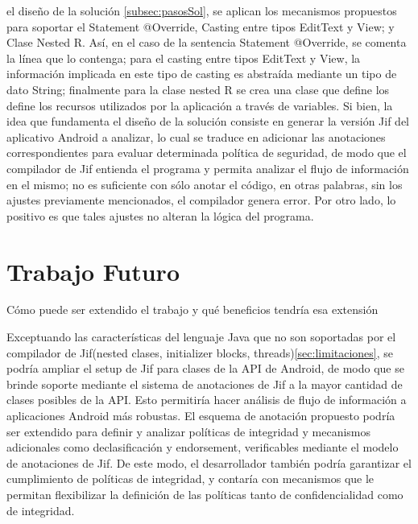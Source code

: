 el diseño de la solución \ref{subsec:pasosSol}, se aplican los mecanismos
propuestos para soportar el Statement @Override, Casting entre tipos EditText y
View; y Clase Nested R. Así, en el caso de  la sentencia Statement @Override, se
comenta la línea que lo contenga; para el casting entre tipos EditText y View,
la información implicada en este tipo de casting es abstraída mediante un tipo
de dato String; finalmente para la clase nested R se crea una clase que define
los define los recursos utilizados por la aplicación a través de variables.\newline 
Si bien, la idea que fundamenta el diseño de la solución consiste en generar la
versión Jif del aplicativo Android a analizar, lo cual se traduce en adicionar
las anotaciones correspondientes para evaluar determinada política de seguridad,
de modo que el compilador de Jif entienda el programa y permita analizar el
flujo de información en el mismo; no es suficiente con sólo anotar el código, en
otras palabras, sin los ajustes previamente mencionados, el compilador genera
error.\newline
Por otro lado, lo positivo es que tales ajustes no alteran la lógica del
programa.


\section{Trabajo Futuro}
Cómo puede ser extendido el trabajo y qué beneficios tendría esa
extensión\newline

Exceptuando las características del lenguaje Java que no son soportadas por el
compilador de Jif(nested clases, initializer blocks,
threads)\ref{sec:limitaciones}, se podría ampliar el setup de Jif para clases
de la API de Android, de modo que se brinde soporte mediante el sistema de
anotaciones de Jif a la mayor cantidad de clases posibles de la API.
Esto permitiría hacer análisis de flujo de información a aplicaciones
Android más robustas.\newline 
El esquema de anotación propuesto podría ser extendido para definir y analizar
políticas de integridad y mecanismos adicionales como declasificación y
endorsement, verificables mediante el modelo de anotaciones de Jif. De este modo,
el desarrollador también podría garantizar el cumplimiento de políticas de
integridad, y contaría con mecanismos que le permitan flexibilizar la definición
de las políticas tanto de confidencialidad como de integridad.



